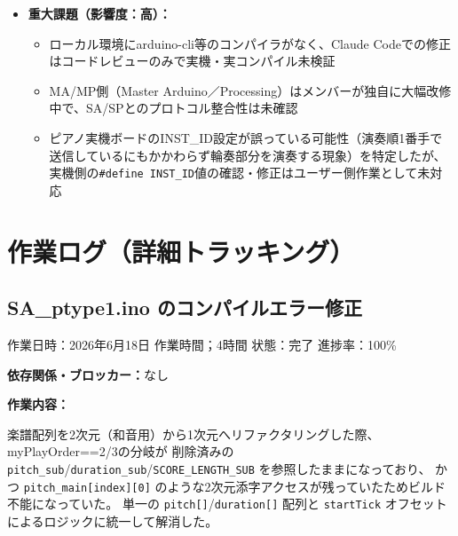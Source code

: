 \documentclass[uplatex,dvipdfmx]{jlreq}
\begin{document}
\begin{itemize}
\begin{itemize}
        \item Ptype3を作成し、楽譜解像度を8分音符基準から16分音符基準（208要素）へ拡張した上で、MA/SA/SP\_DrumのTick送信間隔・演奏順の開始・合流タイミング・ドラム発音間隔・総発音数を整合させる修正を実施
    \end{itemize}
    \item \textbf{重大課題（影響度：高）：}
    \begin{itemize}
        \item ローカル環境にarduino-cli等のコンパイラがなく、Claude Codeでの修正はコードレビューのみで実機・実コンパイル未検証
        \item MA/MP側（Master Arduino／Processing）はメンバーが独自に大幅改修中で、SA/SPとのプロトコル整合性は未確認
        \item ピアノ実機ボードのINST\_ID設定が誤っている可能性（演奏順1番手で送信しているにもかかわらず輪奏部分を演奏する現象）を特定したが、実機側の\texttt{\#define INST\_ID}値の確認・修正はユーザー側作業として未対応
    \end{itemize}
\end{itemize}

\section{作業ログ（詳細トラッキング）}


\subsection{SA\_ptype1.ino のコンパイルエラー修正}
\noindent
作業日時：2026年6月18日 \quad 作業時間；4時間
状態：完了 \quad 進捗率：100\%

\noindent
\textbf{依存関係・ブロッカー：}なし

\noindent
\textbf{作業内容：}

楽譜配列を2次元（和音用）から1次元へリファクタリングした際、myPlayOrder==2/3の分岐が
削除済みの \texttt{pitch\_sub}/\texttt{duration\_sub}/\texttt{SCORE\_LENGTH\_SUB} を参照したままになっており、
かつ \texttt{pitch\_main[index][0]} のような2次元添字アクセスが残っていたためビルド不能になっていた。
単一の \texttt{pitch[]}/\texttt{duration[]} 配列と \texttt{startTick} オフセットによるロジックに統一して解消した。
\end{document}
